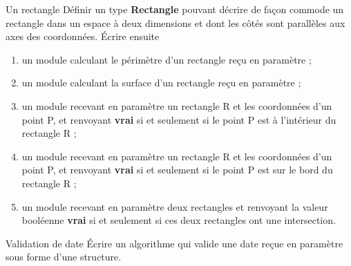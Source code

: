 		
		\begin{Exercice}{Un rectangle}
			Définir un type \textbf{Rectangle} pouvant décrire de façon
			commode un rectangle dans un espace à deux dimensions et dont les côtés
			sont parallèles aux axes des coordonnées. 	
			Écrire ensuite
		
			\begin{enumerate}[label=\alph*)]
			\item {
				un module calculant le périmètre d’un rectangle reçu en paramètre ;}
			\item {
				un module calculant la surface d’un rectangle reçu en paramètre ;}
			\item {
				un module recevant en paramètre un rectangle R et les coordonnées
				d’un point P, et renvoyant 
				\textbf{vrai} si et seulement si le point P est à
				l’intérieur du rectangle R ;}
			\item {
				un module recevant en paramètre un rectangle R et les coordonnées
				d’un point P, et renvoyant 
				\textbf{vrai} si et seulement si le point P est sur le bord du
				rectangle R ;}
			\item {
				un module recevant en paramètre deux rectangles et renvoyant la valeur
				booléenne \textbf{vrai} si et seulement si ces deux rectangles ont une
				intersection.}
			\end{enumerate}
		\end{Exercice}
		
		\begin{Exercice}{Validation de date}
			Écrire un algorithme qui valide une date reçue en paramètre 
			sous forme d’une structure.
		\end{Exercice}

	
